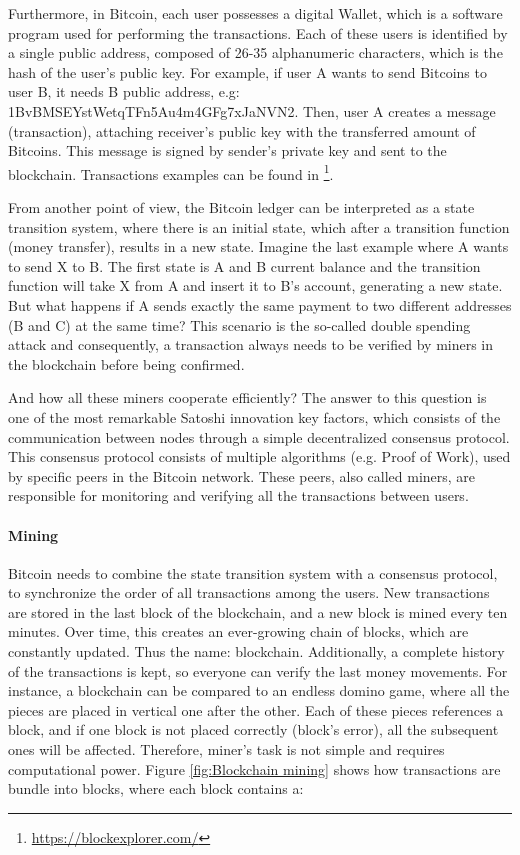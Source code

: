 Furthermore, in Bitcoin, each user possesses a digital Wallet, which is a software program used for performing the transactions. Each of these users is identified by a single public address, composed of 26-35 alphanumeric characters, which is the hash of the user's public key. For example, if user A wants to send Bitcoins to user B, it needs B public address, e.g: 1BvBMSEYstWetqTFn5Au4m4GFg7xJaNVN2. Then, user A creates a message (transaction), attaching receiver's public key with the transferred amount of Bitcoins. This message is signed by sender's private key and sent to the blockchain. Transactions examples can be found in \footnote{\url{https://blockexplorer.com/}}.

From another point of view, the Bitcoin ledger can be interpreted as a state transition system, where there is an initial state, which after a transition function (money transfer), results in a new state. Imagine the last example where A wants to send X to B. The first state is A and B current balance and the transition function will take X from A and insert it to B's account, generating a new state. But what happens if A sends exactly the same payment to two different addresses (B and C) at the same time? This scenario is the so-called double spending attack and consequently, a transaction always needs to be verified by miners in the blockchain before being confirmed.

And how all these miners cooperate efficiently? The answer to this question is one of the most remarkable Satoshi innovation key factors, which consists of the communication between nodes through a simple decentralized consensus protocol. This consensus protocol consists of multiple algorithms (e.g. Proof of Work), used by specific peers in the Bitcoin network. These peers, also called miners, are responsible for monitoring and verifying all the transactions between users.

\paragraph{Mining}

Bitcoin needs to combine the state transition system with a consensus protocol, to synchronize the order of all transactions among the users.
New transactions are stored in the last block of the blockchain, and a new block is mined every ten minutes. Over time, this creates an ever-growing chain of blocks, which are constantly updated. Thus the name: blockchain. Additionally, a complete history of the transactions is kept, so everyone can verify the last money movements. For instance, a blockchain can be compared to an endless domino game, where all the pieces are placed in vertical one after the other. Each of these pieces references a block, and if one block is not placed correctly (block's error), all the subsequent ones will be affected. Therefore, miner's task is not simple and requires computational power. Figure \ref{fig:Blockchain mining} shows how transactions are bundle into blocks, where each block contains a:

